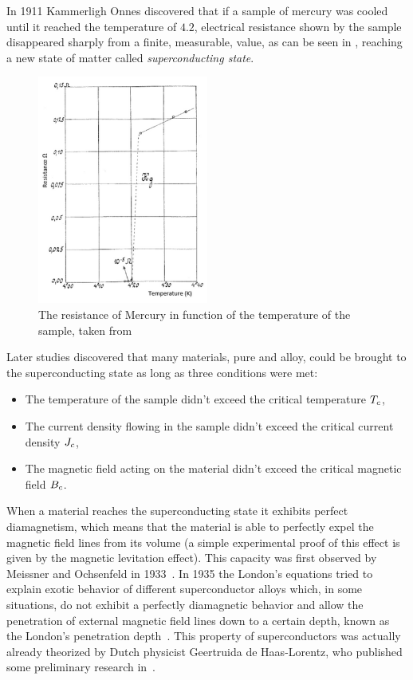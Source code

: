 In 1911 \cite{invention-superconductivity} Kammerligh Onnes discovered that if a sample of mercury was cooled
until it reached the temperature of $4.2$\K, electrical resistance shown by the sample disappeared
sharply from a finite, measurable, value, as can be seen in , reaching
a new state of matter called \emph{superconducting state}.
\begin{figure}
	\centering
	\includegraphics[width=0.5\textwidth]{./img/mercury-resistance.png}
	\caption{The resistance of Mercury in function of the temperature of the sample, taken from~\cite{tsukerman2020compendium}}
	\label{img:mercury-resistance}
\end{figure}

Later studies discovered that many materials, pure and alloy, could be brought to the
superconducting state as long as three conditions were met:
\begin{itemize}
	\item The temperature of the sample didn't exceed the critical temperature $T_c$,
	\item The current density flowing in the sample didn't exceed the critical current
	      density $J_c$,
	\item The magnetic field acting on the material didn't exceed the critical magnetic field $B_c$.
\end{itemize}

When a material reaches the superconducting state it exhibits perfect diamagnetism, which means that
the material is able to perfectly expel the magnetic field lines from its volume (a simple experimental proof of this effect
is given by the magnetic levitation effect). This capacity was first observed by
Meissner and Ochsenfeld in 1933~\cite{meissner1933}. In 1935 the London's equations tried to explain
exotic behavior of different superconductor alloys which, in some situations, do not exhibit a perfectly diamagnetic behavior and allow the
penetration of external magnetic field lines down to a certain depth, known as the London's
penetration depth~\cite{london1935}. This property of superconductors was actually already theorized by Dutch
physicist Geertruida de Haas-Lorentz, who published some preliminary research in~\cite{fokker1925physica}.

